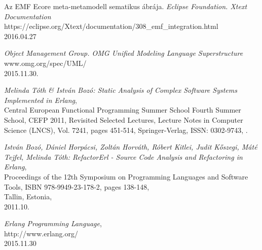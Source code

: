 
\begin{thebibliography}{10}

\newblock Az EMF Ecore meta-metamodell sematikus ábrája.
\newblock \emph{Eclipse Foundation. Xtext Documentation}
\newblock \\ https://eclipse.org/Xtext/documentation/308\_emf\_integration.html
\newblock \\ 2016.04.27

\newblock \emph{Object Management Group. OMG Unified Modeling Language Superstructure}
\newblock \\ www.omg.org/spec/UML/
\newblock \\ 2015.11.30.

\newblock \emph{Melinda Tóth \& István Bozó:
\newblock Static Analysis of Complex Software Systems Implemented in Erlang},
\newblock \\ Central European Functional Programming Summer School Fourth Summer 
School, CEFP 2011, Revisited Selected Lectures, Lecture Notes in Computer
Science (LNCS), Vol. 7241, pages 451-514, Springer-Verlag, ISSN: 0302-9743,
.

\newblock \emph{István Bozó, Dániel Horpácsi, Zoltán Horváth, Róbert Kitlei, Judit Kőszegi, Máté Tejfel, Melinda Tóth:
\newblock RefactorErl - Source Code Analysis and Refactoring in Erlang},
\newblock \\ Proceedings of the 12th Symposium on Programming Languages and Software
Tools, ISBN 978-9949-23-178-2, pages 138-148,
\newblock \\ Tallin, Estonia,
\newblock \\ 2011.10.

\emph{Erlang Programming Language},
\newblock \\ http://www.erlang.org/
\newblock \\ 2015.11.30

\end{thebibliography}
